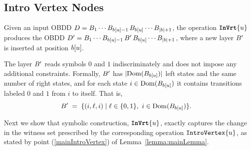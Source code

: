 \subsection{Intro Vertex Nodes}

Given an input OBDD
$D = B_1 \cdots B_{b[u]-1}\,
B_{b[u]}\cdots B_{|b|+1}$,
the operation $\texttt{\textbf{InVrt}}\{u\}$ produces the OBDD
$D' = B_1 \cdots B_{b[u]-1}\,
B'\,B_{b[u]}\cdots B_{|b|+1}$,
where a new layer $B'$ is inserted at position $b[u]$.

The layer $B'$ reads symbols $0$ and $1$ indiscriminately and does not impose
any additional constraints. Formally, $B'$ has
$|\mathrm{Dom}(B_{b[u]})|$ left states and the same number of right states,
and for each state $i \in \mathrm{Dom}(B_{b[u]})$ it contains transitions
labeled $0$ and $1$ from $i$ to itself. That is,
\[
B' \;=\; \{(i,\ell,i) \mid \ell \in \{0,1\},\ i \in \mathrm{Dom}(B_{b[u]})\}.
\]




Next we show that symbolic construction, $\texttt{\textbf{InVrt}}\{u\}$, exactly captures the change in the witness set prescribed by the corresponding operation $\texttt{IntroVertex}\{u\}$, as stated by point (\ref{mainIntroVertex}) of Lemma~\ref{lemma:mainLemma}.

